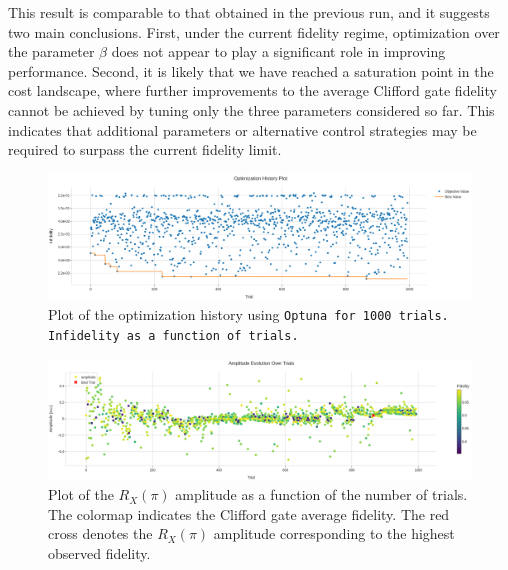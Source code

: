 This result is comparable to that obtained in the previous run, and it suggests two main conclusions. 
First, under the current fidelity regime, optimization over the parameter $\beta$ does not appear to play a significant role in improving performance. 
Second, it is likely that we have reached a saturation point in the cost landscape, where further improvements to the average Clifford gate fidelity cannot be achieved by tuning only the three parameters considered so far. 
This indicates that additional parameters or alternative control strategies may be required to surpass the current fidelity limit.

\begin{figure}[h!]
    \centering
    \includegraphics[width=\textwidth]{figures/png/RB_optimization/Optuna/1000/optimization.png}
    \caption{Plot of the optimization history using \tt{Optuna} for 1000 trials. Infidelity as a function of trials.}
    \label{fig:optuna1000:optimization}
\end{figure}

\begin{figure}[h!]
    \centering
    \includegraphics[width=\textwidth]{figures/png/RB_optimization/Optuna/1000/amplitude.png}
    \caption{Plot of the $R_X(\pi)$ amplitude as a function of the number of trials.     
    The colormap indicates the Clifford gate average fidelity. 
     The red cross denotes the $R_X(\pi)$ amplitude corresponding to the highest observed fidelity.}
    \label{fig:optuna1000:amplitude}
\end{figure}

